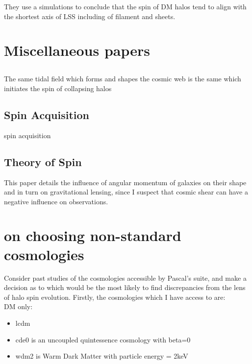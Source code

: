 \documentclass[fleqn,usenatbib]{mnras}
\begin{document}
\subsection{\citet{Libeskind_12}}
They use a simulations to conclude that the spin of DM halos tend to align with the shortest axis of LSS including of filament and sheets.

\section{Miscellaneous papers}
\subsection{\citet{Veena_18}}
 The same tidal field which forms and shapes the cosmic web is the same which initiates the spin of collapsing halos

\subsection{Spin Acquisition \citet{Pichon_16}}
spin acquisition

\subsection{Theory of Spin \citet{Shafer_09}}
This paper details the influence of angular momentum of galaxies on their shape and in turn on gravitational lensing, since I suspect that cosmic shear can have a negative influence on observations.

\section{on choosing non-standard cosmologies}
Consider past studies of the cosmologies accessible by Pascal's suite, and make a decision as to which would be the most likely to find discrepancies from the lens of halo spin evolution.
Firstly, the cosmologies which I have access to are:
\\
DM only:
\begin{itemize}
\item lcdm
\item cde0 is an uncoupled quintessence cosmology with beta=0 
\item wdm2 is Warm Dark Matter with particle energy = 2keV
\end{itemize}
\end{document}
